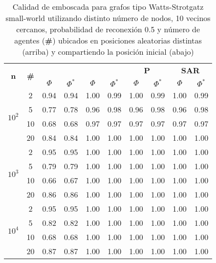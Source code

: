 \begin{table}
	\caption{Calidad de emboscada para grafos tipo Watts-Strotgatz small-world
	utilizando distinto n\'umero de nodos, 10 vecinos cercanos, probabilidad
	de reconexi\'on 0.5 y n\'umero de agentes
	(\textbf{\#}) ubicados en posiciones aleatorias distintas (arriba) y
	compartiendo la posici\'on inicial (abajo)}
	\label{tab:ambush_watts}
	\centering
	\begin{small}
		\setlength{\tabcolsep}{4pt}
		\begin{tabular}{|c|c|cc|cc|cc|cc|}
			\hline
			\multirow{2}{*}{\textbf{n}} &
			\multirow{2}{*}{\textbf{\#}} &
			\multicolumn{2}{c|}{\textbf{\astar}} &
			\multicolumn{2}{c|}{\textbf{\ambush}} &
			\multicolumn{2}{c|}{\textbf{P}} &
			\multicolumn{2}{c|}{\textbf{SAR}}\\
			& & $\Phi$ & $\Phi^*$ & $\Phi$ & $\Phi^*$&
			$\Phi$ & $\Phi^*$& $\Phi$ & $\Phi^*$\\
			\hline
			\multirow{4}{*}{$10^2$}
			 & 2 & 0.94 & 0.94 & 1.00 & 0.99 & 1.00 & 0.99 & 1.00 & 0.99\\
			 & 5 & 0.77 & 0.78 & 0.96 & 0.98 & 0.96 & 0.98 & 0.96 & 0.98\\
			 & 10 & 0.68 & 0.68 & 0.97 & 0.97 & 0.97 & 0.97 & 0.97 & 0.97\\
			 & 20 & 0.84 & 0.84 & 1.00 & 1.00 & 1.00 & 1.00 & 1.00 & 1.00\\
			\hline
			\multirow{4}{*}{$10^3$}
			 & 2 & 0.95 & 0.95 & 1.00 & 1.00 & 1.00 & 1.00 & 1.00 & 1.00\\
			 & 5 & 0.79 & 0.79 & 1.00 & 1.00 & 1.00 & 1.00 & 1.00 & 1.00\\
			 & 10 & 0.66 & 0.67 & 1.00 & 1.00 & 1.00 & 1.00 & 1.00 & 1.00\\
			 & 20 & 0.86 & 0.86 & 1.00 & 1.00 & 1.00 & 1.00 & 1.00 & 1.00\\
			 \hline
			\multirow{4}{*}{$10^4$}
			 & 2 & 0.95 & 0.95 & 1.00 & 1.00 & 1.00 & 1.00 & 1.00 & 1.00\\
			 & 5 & 0.82 & 0.82 & 1.00 & 1.00 & 1.00 & 1.00 & 1.00 & 1.00\\
			 & 10 & 0.68 & 0.68 & 1.00 & 1.00 & 1.00 & 1.00 & 1.00 & 1.00\\
			 & 20 & 0.87 & 0.87 & 1.00 & 1.00 & 1.00 & 1.00 & 1.00 & 1.00\\
			 \hline
		\end{tabular}
		

\end{small}
\end{table}
